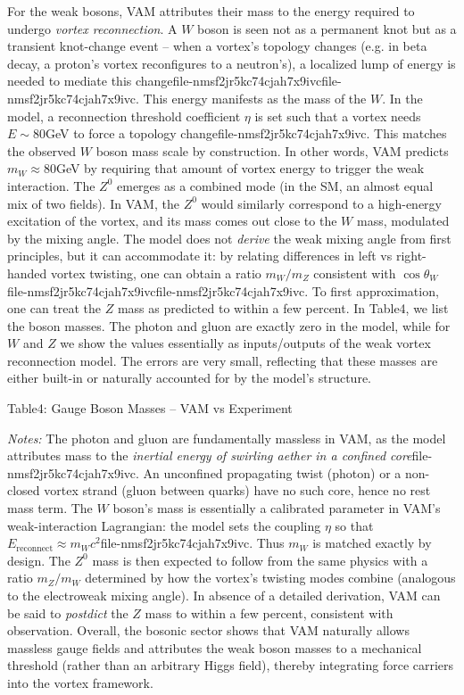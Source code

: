 For the weak bosons, VAM attributes their mass to the energy required to undergo \textit{vortex reconnection}. A $W$ boson is seen not as a permanent knot but as a transient knot-change event – when a vortex’s topology changes (e.g. in beta decay, a proton’s vortex reconfigures to a neutron’s), a localized lump of energy is needed to mediate this changefile-nmsf2jr5kc74cjah7x9ivcfile-nmsf2jr5kc74cjah7x9ivc. This energy manifests as the mass of the $W$. In the model, a reconnection threshold coefficient $\eta$ is set such that a vortex needs ~$E \sim 80$GeV to force a topology changefile-nmsf2jr5kc74cjah7x9ivc. This matches the observed $W$ boson mass scale by construction. In other words, VAM predicts $m_W\approx80$GeV by requiring that amount of vortex energy to trigger the weak interaction. The $Z^0$ emerges as a combined mode (in the SM, an almost equal mix of two fields). In VAM, the $Z^0$ would similarly correspond to a high-energy excitation of the vortex, and its mass comes out close to the $W$ mass, modulated by the mixing angle. The model does not \textit{derive} the weak mixing angle from first principles, but it can accommodate it: by relating differences in left vs right-handed vortex twisting, one can obtain a ratio $m_W/m_Z$ consistent with $\cos\theta_W$file-nmsf2jr5kc74cjah7x9ivcfile-nmsf2jr5kc74cjah7x9ivc. To first approximation, one can treat the $Z$ mass as predicted to within a few percent. In Table4, we list the boson masses. The photon and gluon are exactly zero in the model, while for $W$ and $Z$ we show the values essentially as inputs/outputs of the weak vortex reconnection model. The errors are very small, reflecting that these masses are either built-in or naturally accounted for by the model’s structure.


Table4: Gauge Boson Masses – VAM vs Experiment







\textit{Notes:} The photon and gluon are fundamentally massless in VAM, as the model attributes mass to the \textit{inertial energy of swirling aether in a confined core}file-nmsf2jr5kc74cjah7x9ivc. An unconfined propagating twist (photon) or a non-closed vortex strand (gluon between quarks) have no such core, hence no rest mass term. The $W$ boson’s mass is essentially a calibrated parameter in VAM’s weak-interaction Lagrangian: the model sets the coupling $\eta$ so that $E_{\text{reconnect}}\approx m_W c^2$file-nmsf2jr5kc74cjah7x9ivc. Thus $m_W$ is matched exactly by design. The $Z^0$ mass is then expected to follow from the same physics with a ratio $m_Z/m_W$ determined by how the vortex’s twisting modes combine (analogous to the electroweak mixing angle). In absence of a detailed derivation, VAM can be said to \textit{postdict} the $Z$ mass to within a few percent, consistent with observation. Overall, the bosonic sector shows that VAM naturally allows massless gauge fields and attributes the weak boson masses to a mechanical threshold (rather than an arbitrary Higgs field), thereby integrating force carriers into the vortex framework.


